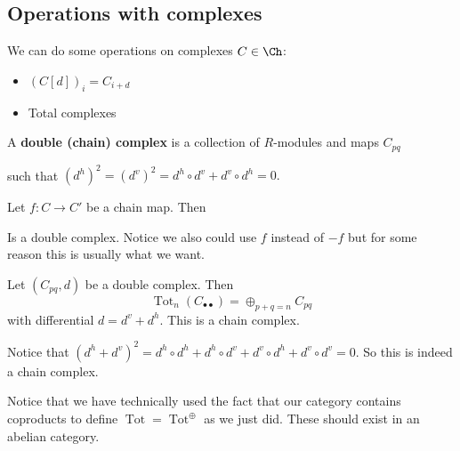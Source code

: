 \documentclass[12pt]{article}
\begin{document}
\subsection{Operations with complexes}
We can do some operations on complexes $C\in\Ch$:
\begin{itemize}
	\item $(C[d])_i=C_{i+d}$
	\item Total complexes
\end{itemize}
\begin{defn}
	A \textbf{double (chain) complex} is a collection of $R$-modules and maps $C_{pq}$ 
	\begin{center}
	\end{center}

	such that $(d^h)^2=(d^v)^2=d^h\circ d^v+d^v\circ d^h=0.$
\end{defn}
\begin{ex}
	Let $f:C\to C'$ be a chain map. Then 

	\begin{center}
	\end{center}

	Is a double complex. Notice we also could use $f$ instead of $-f$ but for some reason this 
	is usually what we want.
\end{ex}
\begin{defn}
	Let $(C_{pq},d)$ be a double complex. Then
	\[\operatorname{Tot}_n(C_{\bullet\bullet})=\oplus_{p+q=n}C_{pq}\]
	with differential $d=d^v+d^h$. This is a chain complex.
\end{defn}
\begin{rmk}
	Notice that $(d^h+d^v)^2=d^h\circ d^h+d^h\circ d^v+d^v\circ d^h+d^v\circ d^v=0.$ So this
	is indeed a chain complex.
\end{rmk}
\begin{rmk}
	Notice that we have technically used the fact that our category contains coproducts to
	define $\operatorname{Tot}=\operatorname{Tot}^\oplus$ as we just did. These should exist 
	in an abelian category.
\end{rmk}
\end{document}
